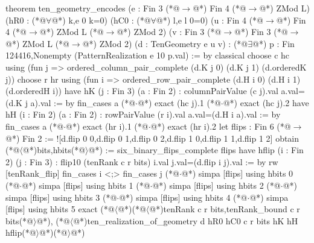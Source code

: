 theorem ten_geometry_encodes
    (e : Fin 3 (*@$\to$@*) Fin 4 (*@$\to$@*) ZMod L)
    (hR0 : (*@$\forall$@*) k,e 0 k=0) (hC0 : (*@$\forall$@*) l,e l 0=0)
    (u : Fin 4 (*@$\to$@*) Fin 4 (*@$\to$@*) ZMod L (*@$\to$@*) ZMod 2)
    (v : Fin 3 (*@$\to$@*) Fin 3 (*@$\to$@*) ZMod L (*@$\to$@*) ZMod 2)
    (d : TenGeometry e u v) :
    (*@$\exists$@*) p : Fin 124416,Nonempty (PatternRealization e 10 p.val) := by
  classical
  choose c hc using (fun j => ordered_column_pair_complete (d.K j 0) (d.K j 1) (d.orderedK j))
  choose r hr using (fun i => ordered_row_pair_complete (d.H i 0) (d.H i 1) (d.orderedH i))
  have hK (j : Fin 3) (a : Fin 2) : columnPairValue (c j).val a.val=(d.K j a).val := by
    fin_cases a
    (*@$\cdot$@*) exact (hc j).1
    (*@$\cdot$@*) exact (hc j).2
  have hH (i : Fin 2) (a : Fin 2) : rowPairValue (r i).val a.val=(d.H i a).val := by
    fin_cases a
    (*@$\cdot$@*) exact (hr i).1
    (*@$\cdot$@*) exact (hr i).2
  let flips : Fin 6 (*@$\to$@*) Fin 2 := ![d.flip 0 0,d.flip 0 1,d.flip 0 2,d.flip 1 0,d.flip 1 1,d.flip 1 2]
  obtain (*@$\langle$@*)bits,hbits(*@$\rangle$@*) := six_binary_flips_complete flips
  have hflip (i : Fin 2) (j : Fin 3) : flip10 (tenRank c r bits) i.val j.val=(d.flip i j).val := by
    rw [tenRank_flip]
    fin_cases i <;> fin_cases j
    (*@$\cdot$@*) simpa [flips] using hbits 0
    (*@$\cdot$@*) simpa [flips] using hbits 1
    (*@$\cdot$@*) simpa [flips] using hbits 2
    (*@$\cdot$@*) simpa [flips] using hbits 3
    (*@$\cdot$@*) simpa [flips] using hbits 4
    (*@$\cdot$@*) simpa [flips] using hbits 5
  exact (*@$\langle$@*)(*@$\langle$@*)tenRank c r bits,tenRank_bound c r bits(*@$\rangle$@*),
    (*@$\langle$@*)ten_realization_of_geometry d hR0 hC0 c r bits hK hH hflip(*@$\rangle$@*)(*@$\rangle$@*)
